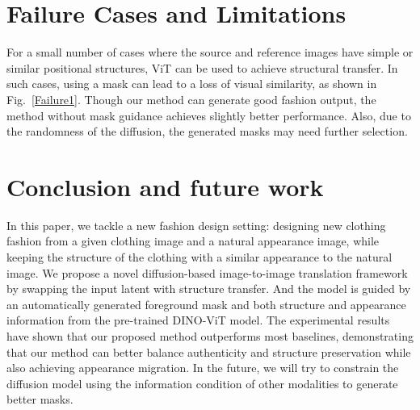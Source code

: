 \section{Failure Cases and Limitations}

For a small number of cases where the source and reference images have simple or similar positional structures, ViT can be used to achieve structural transfer. In such cases, using a mask can lead to a loss of visual similarity, as shown in Fig.~\ref{Failure1}. Though our method can generate good fashion output, the method without mask guidance achieves slightly better performance. Also, due to the randomness of the diffusion, the generated masks may need further selection.

\section{Conclusion and future work}
\label{sec:conclude}

In this paper, we tackle a new fashion design setting: designing new clothing fashion from a given clothing image and a natural appearance image, while keeping the structure of the clothing with a similar appearance to the natural image. We propose a novel diffusion-based image-to-image translation framework by swapping the input latent with structure transfer. And the model is guided by an automatically generated foreground mask and both structure and appearance information from the pre-trained DINO-ViT model.
The experimental results have shown that our proposed method outperforms most baselines, demonstrating that our method can better balance authenticity and structure preservation while also achieving appearance migration.
In the future, we will try to constrain the diffusion model using the information condition of other modalities to generate better masks. 
